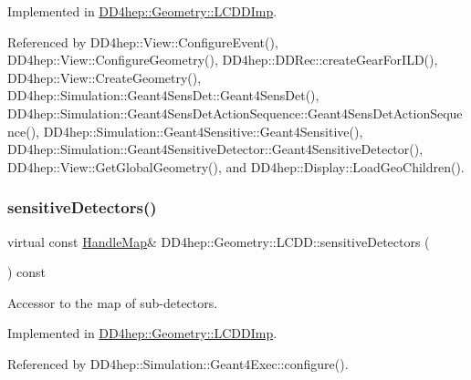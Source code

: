 Implemented in \hyperlink{class_d_d4hep_1_1_geometry_1_1_l_c_d_d_imp_a4a3de80d993e90db97a90b0e69e90e20}{D\+D4hep\+::\+Geometry\+::\+L\+C\+D\+D\+Imp}.



Referenced by D\+D4hep\+::\+View\+::\+Configure\+Event(), D\+D4hep\+::\+View\+::\+Configure\+Geometry(), D\+D4hep\+::\+D\+D\+Rec\+::create\+Gear\+For\+I\+L\+D(), D\+D4hep\+::\+View\+::\+Create\+Geometry(), D\+D4hep\+::\+Simulation\+::\+Geant4\+Sens\+Det\+::\+Geant4\+Sens\+Det(), D\+D4hep\+::\+Simulation\+::\+Geant4\+Sens\+Det\+Action\+Sequence\+::\+Geant4\+Sens\+Det\+Action\+Sequence(), D\+D4hep\+::\+Simulation\+::\+Geant4\+Sensitive\+::\+Geant4\+Sensitive(), D\+D4hep\+::\+Simulation\+::\+Geant4\+Sensitive\+Detector\+::\+Geant4\+Sensitive\+Detector(), D\+D4hep\+::\+View\+::\+Get\+Global\+Geometry(), and D\+D4hep\+::\+Display\+::\+Load\+Geo\+Children().

\hypertarget{class_d_d4hep_1_1_geometry_1_1_l_c_d_d_a576c24cc18698eb14658466999fca65d}{}\label{class_d_d4hep_1_1_geometry_1_1_l_c_d_d_a576c24cc18698eb14658466999fca65d} 
\subsubsection{\texorpdfstring{sensitive\+Detectors()}{sensitiveDetectors()}}
{\footnotesize\ttfamily virtual const \hyperlink{class_d_d4hep_1_1_geometry_1_1_l_c_d_d_a05cb11e7355772c7b0794bcca59bf477}{Handle\+Map}\& D\+D4hep\+::\+Geometry\+::\+L\+C\+D\+D\+::sensitive\+Detectors (\begin{DoxyParamCaption}{ }\end{DoxyParamCaption}) const\hspace{0.3cm}{\ttfamily [pure virtual]}}



Accessor to the map of sub-\/detectors. 



Implemented in \hyperlink{class_d_d4hep_1_1_geometry_1_1_l_c_d_d_imp_abe81e9e0c070665c809067d61dac3784}{D\+D4hep\+::\+Geometry\+::\+L\+C\+D\+D\+Imp}.



Referenced by D\+D4hep\+::\+Simulation\+::\+Geant4\+Exec\+::configure().

\hypertarget{class_d_d4hep_1_1_geometry_1_1_l_c_d_d_a9927ac6aeae1dad18e22413deba9aa65}{}\label{class_d_d4hep_1_1_geometry_1_1_l_c_d_d_a9927ac6aeae1dad18e22413deba9aa65} 
